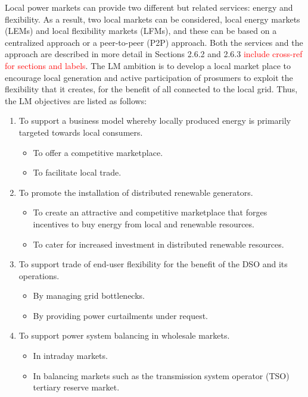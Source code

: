 Local power markets can provide two different but related services: energy and flexibility. As a result, two local markets can be considered, local energy markets (LEMs) and local flexibility markets (LFMs), and these can be based on a centralized approach or a peer-to-peer (P2P) approach. Both the services and the approach are described in more detail in Sections 2.6.2 and 2.6.3 \textcolor{red}{include cross-ref for sections and labels}. The LM ambition is to develop a local market place to encourage local generation and active participation of prosumers to exploit the flexibility that it creates, for the benefit of all connected to the local grid. Thus, the LM objectives are listed as follows:

\begin{enumerate}
\item To support a business model whereby locally produced energy is primarily targeted towards local
consumers.
\begin{itemize}
\item To offer a competitive marketplace.
\item To facilitate local trade.
\end{itemize}
\item To promote the installation of distributed renewable generators.
\begin{itemize}
\item To create an attractive and competitive marketplace that forges incentives to buy energy from local
and renewable resources.
\item To cater for increased investment in distributed renewable resources.
\end{itemize}
\item To support trade of end-user flexibility for the benefit of the DSO and its operations.
\begin{itemize}
\item By managing grid bottlenecks.
\item By providing power curtailments under request.
\end{itemize}
\item To support power system balancing in wholesale markets.
\begin{itemize}
\item In intraday markets.
\item In balancing markets such as the transmission system operator (TSO) tertiary reserve market.
\end{itemize}
\end{enumerate}

